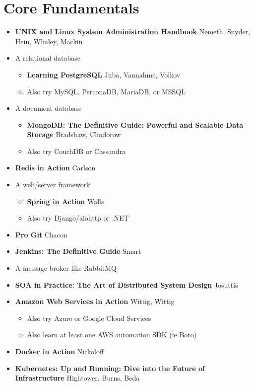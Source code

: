 \documentclass[12pt]{article}
\begin{document}
\section{Core Fundamentals}
\begin{itemize}
\item \textbf{UNIX and Linux System Administration Handbook} Nemeth, Snyder, Hein, Whaley, Mackin
\item A relational database
  \begin{itemize}
  \item \textbf{Learning PostgreSQL} Juba, Vannahme, Volkov
  \item Also try MySQL, PerconaDB, MariaDB, or MSSQL
  \end{itemize}
\item A document database
  \begin{itemize}
  \item \textbf{MongoDB: The Definitive Guide: Powerful and Scalable Data Storage} Bradshaw, Chodorow
  \item Also try CouchDB or Cassandra
  \end{itemize}
\item \textbf{Redis in Action} Carlson
\item A web/server framework
  \begin{itemize}
  \item \textbf{Spring in Action} Walls
  \item Also try Django/aiohttp or .NET
  \end{itemize}
\item \textbf{Pro Git} Chacon
\item \textbf{Jenkins: The Definitive Guide} Smart
\item A message broker like RabbitMQ
\item \textbf{SOA in Practice: The Art of Distributed System Design} Josuttis
\item \textbf{Amazon Web Services in Action} Wittig, Wittig
  \begin{itemize}
  \item Also try Azure or Google Cloud Services
  \item Also learn at least one AWS automation SDK (ie Boto)
  \end{itemize}
\item \textbf{Docker in Action} Nickoloff
\item \textbf{Kubernetes: Up and Running: Dive into the Future of Infrastructure}  Hightower, Burns, Beda
  \begin{itemize}

\end{itemize}
\end{itemize}
\end{document}

